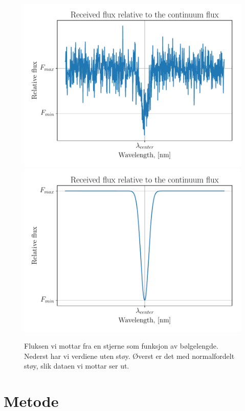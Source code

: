 \documentclass[reprint, english,notitlepage]{revtex4-1}  %
\begin{document}
 \begin{figure}
   \includegraphics[width=\linewidth]{../output/plots/theoretical_flux_noise.pdf}
   \includegraphics[width=\linewidth]{../output/plots/theoretical_flux_nonoise.pdf}
   \caption{Fluksen vi mottar fra en stjerne som funksjon av bølgelengde. Nederst har vi verdiene uten støy. Øverst er det med normalfordelt støy, slik dataen vi mottar ser ut.}
   \label{fig:theoretical_flux}
 \end{figure}




\section{Metode}
\end{document}
